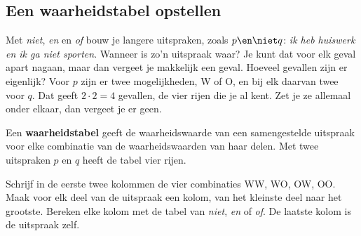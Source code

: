 \subsection{Een waarheidstabel opstellen}

Met \textit{niet}, \textit{en} en \textit{of} bouw je langere uitspraken, zoals $p \en \niet q$: \textit{ik heb huiswerk en ik ga niet sporten}. Wanneer is zo'n uitspraak waar? Je kunt dat voor elk geval apart nagaan, maar dan vergeet je makkelijk een geval. Hoeveel gevallen zijn er eigenlijk? Voor $p$ zijn er twee mogelijkheden, W of O, en bij elk daarvan twee voor $q$. Dat geeft $2 \cdot 2 = 4$ gevallen, de vier rijen die je al kent. Zet je ze allemaal onder elkaar, dan vergeet je er geen.

\begin{theorie}
Een \textbf{\textcolor{accent}{waarheidstabel}} geeft de waarheidswaarde van een samengestelde uitspraak voor elke combinatie van de waarheidswaarden van haar delen. Met twee uitspraken $p$ en $q$ heeft de tabel vier rijen.
\end{theorie}


\begin{werkwijze}
Schrijf in de eerste twee kolommen de vier combinaties WW, WO, OW, OO. Maak voor elk deel van de uitspraak een kolom, van het kleinste deel naar het grootste. Bereken elke kolom met de tabel van \textit{niet}, \textit{en} of \textit{of}. De laatste kolom is de uitspraak zelf.
\end{werkwijze}

